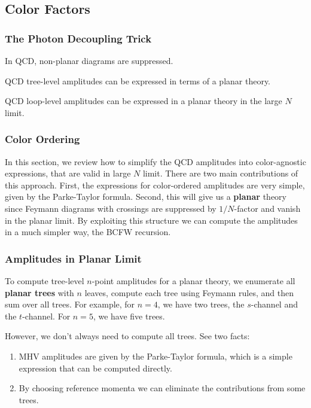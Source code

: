 \subsection{Color Factors}

\subsubsection{The Photon Decoupling Trick}

\begin{fact}
    In QCD, non-planar diagrams are suppressed. 
\end{fact}




\begin{fact}
    \item QCD tree-level amplitudes can be expressed in terms of a planar theory.
    \item QCD loop-level amplitudes can be expressed in a planar theory in the large $N$ limit.
\end{fact}

\subsubsection{Color Ordering}

In this section, we review how to simplify the QCD amplitudes into color-agnostic expressions, that are valid in large $N$ limit. There are two main contributions of this approach. 
First, the expressions for color-ordered amplitudes are very simple, given by the Parke-Taylor formula.
Second, this will give us a \textbf{planar} theory since Feymann diagrams with crossings are suppressed by $1/N$-factor and vanish in the planar limit. By exploiting this structure we can compute the amplitudes in a much simpler way, the BCFW recursion.





\subsubsection{Amplitudes in Planar Limit}

To compute tree-level $n$-point amplitudes for a planar theory, we enumerate all \textbf{planar trees} with $n$ leaves, compute each tree using Feymann rules,
and then sum over all trees. For example, for $n = 4$, we have two trees, the $s$-channel and the $t$-channel. For $n = 5$, we have five trees.

However, we don't always need to compute all trees. See two facts:
\begin{enumerate}
    \item MHV amplitudes are given by the Parke-Taylor formula, which is a simple expression that can be computed directly.
    \item By choosing reference momenta we can eliminate the contributions from some trees.
\end{enumerate}


